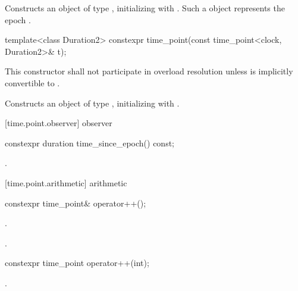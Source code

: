 \begin{itemdescr}
\pnum
\effects Constructs an object of type , initializing
 with . Such a  object represents the epoch
.
\end{itemdescr}

%
\begin{itemdecl}
template<class Duration2>
  constexpr time_point(const time_point<clock, Duration2>& t);
\end{itemdecl}

\begin{itemdescr}
\pnum
\remarks This constructor shall not participate in overload resolution unless 
is implicitly convertible to .

\pnum
\effects Constructs an object of type , initializing
 with .
\end{itemdescr}

[time.point.observer]{ observer}

%
\begin{itemdecl}
constexpr duration time_since_epoch() const;
\end{itemdecl}

\begin{itemdescr}
\pnum
\returns {}.
\end{itemdescr}

[time.point.arithmetic]{ arithmetic}

%
\begin{itemdecl}
constexpr time_point& operator++();
\end{itemdecl}

\begin{itemdescr}
\pnum
\effects {}.

\pnum
\returns {}.
\end{itemdescr}

%
\begin{itemdecl}
constexpr time_point operator++(int);
\end{itemdecl}

\begin{itemdescr}
\pnum
\returns {}.
\end{itemdescr}

